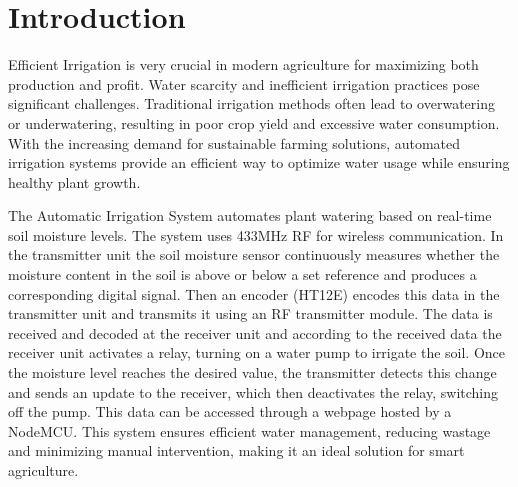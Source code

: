 \chapter{Introduction}
\setlength\parindent{1cm}

Efficient Irrigation is very crucial in modern agriculture for
maximizing both production and profit. Water scarcity and inefficient
irrigation practices pose significant challenges. Traditional
irrigation methods often lead to overwatering or underwatering,
resulting in poor crop yield and excessive water consumption. With
the increasing demand for sustainable farming solutions, automated
irrigation systems provide an efficient way to optimize water usage
while ensuring healthy plant growth.

The Automatic Irrigation System automates plant watering based on
real-time soil moisture levels. The system uses 433MHz RF for
wireless communication. In the transmitter unit the soil moisture
sensor continuously measures whether the moisture content in the soil
is above or below a set reference and produces a corresponding
digital signal. Then an encoder (HT12E) encodes this data in the
transmitter unit and transmits it using an RF transmitter module. The
data is received and decoded at the receiver unit and according to
the received data the receiver unit activates a relay, turning on a
water pump to irrigate the soil. Once the moisture level reaches the
desired value, the transmitter detects this change and sends an
update to the receiver, which then deactivates the relay, switching
off the pump. This data can be accessed through a webpage hosted by a
NodeMCU. This system ensures efficient water management, reducing
wastage and minimizing manual intervention, making it an ideal
solution for smart agriculture.
